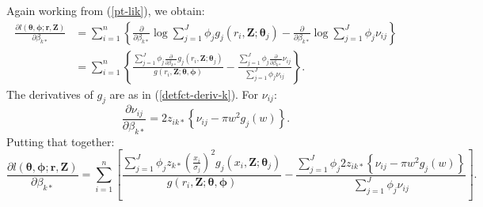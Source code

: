 Again working from (\ref{pt-lik}), we obtain:
\begin{align*}
\frac{\partial l(\bm{\theta}, \bm{\phi}; \mathbf{r},\mathbf{Z})}{\partial \beta_{k*}}  &= \sum_{i=1}^n \left \{ \frac{\partial}{\partial \beta_{k*}} \log \sum_{j=1}^J \phi_j g_j(r_i,\mathbf{Z}; \bm{\theta}_j) - \frac{\partial}{\partial \beta_{k*}}\log \sum_{j=1}^J \phi_j \nu_{ij}\right \}\\
&= \sum_{i=1}^n \left \{ \frac{ \sum_{j=1}^J \phi_{j} \frac{\partial}{\partial \beta_{k*}}  g_{j} (r_i,\mathbf{Z}; \bm{\theta}_j)}{g(r_i,\mathbf{Z}; \bm{\theta}, \bm{\phi})} - \frac{ \sum_{j=1}^J \phi_{j}\frac{\partial}{\partial \beta_{k*}}  \nu_{ij} }{ \sum_{j=1}^J \phi_j \nu_{ij}}\right \}.
\end{align*}
The derivatives of $g_j$ are as in (\ref{detfct-deriv-k}). For $\nu_{ij}$:
\begin{equation*}
\frac{\partial \nu_{ij}}{\partial \beta_{k*}} =  2z_{ik*} \left \{ \nu_{ij} - \pi w^2 g_j(w) \right \}.
\end{equation*}
Putting that together:
\begin{equation*}
\frac{\partial l(\bm{\theta}, \bm{\phi}; \mathbf{r},\mathbf{Z})}{\partial \beta_{k*}}  = \sum_{i=1}^n \left [ \frac{ \sum_{j=1}^J \phi_{j} z_{k*} \left ( \frac{x_i}{\sigma_{j}}\right )^2 g_j(x_i,\mathbf{Z}; \bm{\theta}_j)}{g(r_i,\mathbf{Z}; \bm{\theta}, \bm{\phi})} - \frac{ \sum_{j=1}^J \phi_{j}2z_{ik*} \left \{ \nu_{ij} - \pi w^2 g_j(w) \right \} }{ \sum_{j=1}^J \phi_j \nu_{ij}}\right ].
\end{equation*}
